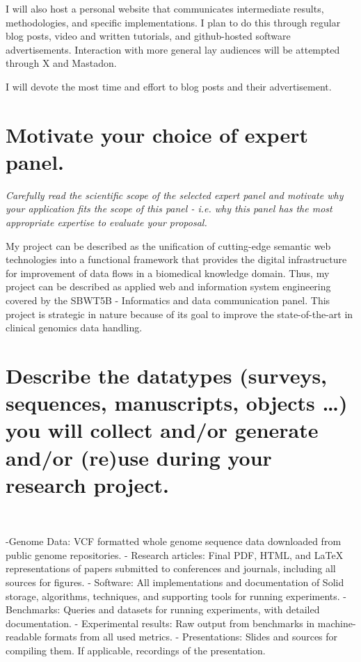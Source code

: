 {I will also host a personal website that communicates intermediate results, methodologies, and specific implementations. 
I plan to do this through regular blog posts, video and written tutorials, and github-hosted software advertisements. 
Interaction with more general lay audiences will be attempted through X and Mastadon.

I will devote the most time and effort to blog posts and their advertisement.


\section{Motivate your choice of expert panel.}
\textit{
Carefully read the scientific scope of the selected expert panel and motivate why your application fits the scope of this panel - 
i.e. why this panel has the most appropriate expertise to evaluate your proposal.
}

My project can be described as the unification of cutting-edge semantic web technologies into a functional framework that provides the digital infrastructure for improvement of data flows in a biomedical knowledge domain.
Thus, my project can be described as applied web and information system engineering covered by the SBWT5B - Informatics and data communication panel.
This project is strategic in nature because of its goal to improve the state-of-the-art in clinical genomics data handling. 



\section{Describe the datatypes (surveys, sequences, manuscripts, objects …) you will collect and/or generate and/or (re)use during your research project.}
\

-Genome Data: VCF formatted whole genome sequence data downloaded from public genome repositories.
- Research articles: Final PDF, HTML, and LaTeX representations of papers submitted to conferences and journals, including all sources for figures.
- Software: All implementations and documentation of Solid storage, algorithms, techniques, and supporting tools for running experiments.
- Benchmarks: Queries and datasets for running experiments, with detailed documentation.
- Experimental results: Raw output from benchmarks in machine-readable formats from all used metrics.
- Presentations: Slides and sources for compiling them. If applicable, recordings of the presentation.



}
